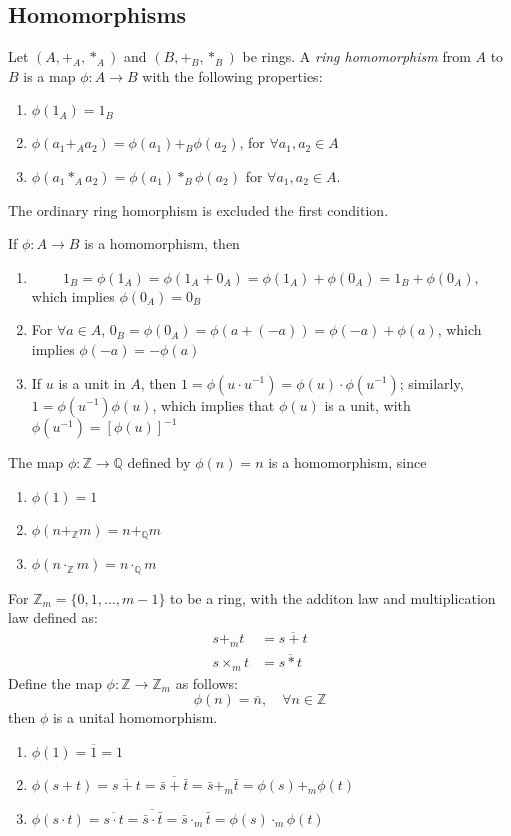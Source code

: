 \subsection{Homomorphisms}
\begin{definition}
Let $(A,+_A,*_A)$ and $(B,+_B,*_B)$ be rings. A \emph{ring homomorphism} from $A$ to $B$ is a map $\phi: A\to B$ with the following properties:
\begin{enumerate}
\item
$\phi(1_A)=1_B$
\item
$\phi(a_1+_Aa_2) = \phi(a_1)+_B\phi(a_2)$, for $\forall a_1,a_2\in A$
\item
$\phi(a_1*_Aa_2) = \phi(a_1)*_B\phi(a_2)$ for $\forall a_1,a_2\in A$.
\end{enumerate}
\end{definition}
The ordinary ring homorphism is excluded the first condition.
\begin{remark}
If $\phi: A\to B$ is a homomorphism, then
\begin{enumerate}
\item
\[
1_B=\phi(1_A)=\phi(1_A+0_A)=\phi(1_A)+\phi(0_A)=1_B+\phi(0_A),
\]
which implies $\phi(0_A)=0_B$
\item
For $\forall a\in A$, $0_B=\phi(0_A)=\phi(a+(-a))=\phi(-a)+\phi(a)$, which implies $\phi(-a)=-\phi(a)$
\item
If $u$ is a unit in $A$, then $1=\phi(u\cdot u^{-1})=\phi(u)\cdot \phi(u^{-1})$; similarly, $1=\phi(u^{-1})\phi(u)$, which implies that $\phi(u)$ is a unit, with $\phi(u^{-1})=[\phi(u)]^{-1}$
\end{enumerate}
\end{remark}
\begin{example}
The map $\phi:\mathbb{Z}\to\mathbb{Q}$ defined by $\phi(n)=n$ is a homomorphism, since
\begin{enumerate}
\item
$\phi(1)=1$
\item
$\phi(n+_{\mathbb{Z}}m)=n+_{\mathbb{Q}}m$
\item
$\phi(n\cdot_{\mathbb{Z}}m)=n\cdot_{\mathbb{Q}}m$
\end{enumerate}
\end{example}
\begin{example}
For $\mathbb{Z}_m=\{0,1,\dots,m-1\}$ to be a ring,  with the additon law and multiplication law defined as:
\begin{align*}
s+_mt&=\overline{s+t}\\
s\times_mt&=\overline{s*t}
\end{align*}
Define the map $\phi:\mathbb{Z}\to\mathbb{Z}_m$ as follows:
\[
\phi(n)=\overline{n},\quad\forall n\in\mathbb{Z}
\]
then $\phi$ is a unital homomorphism.
\begin{enumerate}
\item
$\phi(1)=\overline{1}=1$
\item
$\phi(s+t)=\overline{s+t}=\overline{\bar s+\bar t}=\bar s+_m\bar t=\phi(s)+_m\phi(t)$
\item
$\phi(s\cdot t)=\overline{s\cdot t}=\overline{\bar s\cdot \bar t}=\bar s\cdot_m\bar t=\phi(s)\cdot_m\phi(t)$
\end{enumerate}
\end{example}
